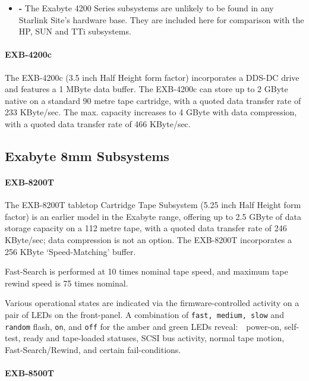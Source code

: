 \documentclass[11pt]{article}
\begin{document}
\begin {itemize}

\item[{\huge\bf -}] The Exabyte 4200 Series subsystems are unlikely to be found
in any Starlink Site's hardware base. They are included here for comparison with
the HP, SUN and TTi subsystems.

\end {itemize}

\paragraph {EXB-4200c}

The EXB-4200c (3.5 inch Half Height form factor) incorporates a DDS-DC drive
and features a 1 MByte data buffer. The EXB-4200c can store up to 2 GByte
native on a standard 90 metre tape cartridge, with a quoted data transfer
rate of 233 KByte/sec. The max. capacity increases to 4 GByte with data
compression, with a quoted data transfer rate of 466 KByte/sec.

\subsection {Exabyte 8mm Subsystems}

\paragraph {EXB-8200T}

The EXB-8200T tabletop Cartridge Tape Subsystem (5.25 inch Half Height form
factor) is an earlier model in the Exabyte range, offering up to 2.5 GByte
of data storage capacity on a 112 metre tape, with a quoted data transfer
rate of 246 KByte/sec; data compression is not an option. The EXB-8200T
incorporates a 256 KByte `Speed-Matching' buffer.

Fast-Search is performed at 10 times nominal tape speed, and maximum tape
rewind speed is 75 times nominal.

Various operational states are indicated via the firmware-controlled activity
on a pair of LEDs on the front-panel. A combination of {\tt fast, medium, slow}
and {\tt random} flash, {\tt on}, and {\tt off} for the amber and green
LEDs reveal:\ \ power-on, self-test, ready and tape-loaded statuses, SCSI bus
activity, normal tape motion, Fast-Search/Rewind, and certain fail-conditions.

\paragraph {EXB-8500T}
\end{document}
